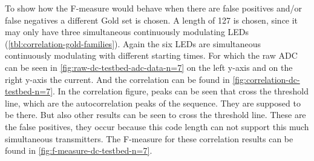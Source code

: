 To show how the F-measure would behave when there are false positives and/or false negatives a different Gold set is chosen.
A length of 127 is chosen, since it may only have three simultaneous continuously modulating LEDs (\autoref{tbl:correlation-gold-families}).
Again the six LEDs are simultaneous continuously modulating with different starting times.
For which the raw ADC can be seen in \autoref{fig:raw-dc-testbed-adc-data-n=7} on the left y-axis and on the right y-axis the current.
And the correlation can be found in \autoref{fig:correlation-dc-testbed-n=7}.
In the correlation figure, peaks can be seen that cross the threshold line, which are the autocorrelation peaks of the sequence.
They are supposed to be there.
But also other results can be seen to cross the threshold line.
These are the false positives, they occur because this code length can not support this much simultaneous transmitters.
The F-measure for these correlation results can be found in \autoref{fig:f-measure-dc-testbed-n=7}.


